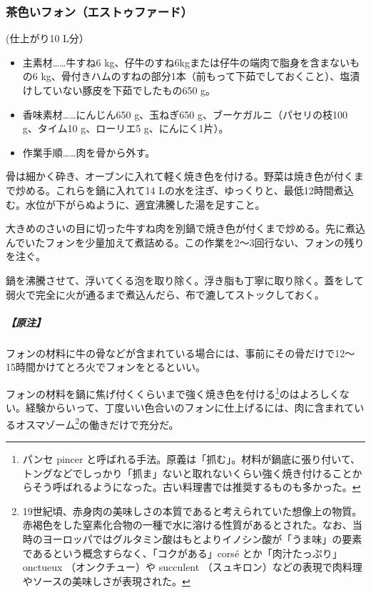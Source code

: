 \begin{recette}

\hypertarget{fonds-brun}{%
\subsubsection{茶色いフォン（エストゥファード）}\label{fonds-brun}}


 

(仕上がり10 L分）

\begin{itemize}
\item
  主素材\ldots{}\ldots{}牛すね6
  kg、仔牛のすね6kgまたは仔牛の端肉で脂身を含まないもの6
  kg、骨付きハムのすねの部分1本（前もって下茹でしておくこと）、塩漬けしていない豚皮を下茹でしたもの650
  g。
\item
  香味素材\ldots{}\ldots{}にんじん650 g、玉ねぎ650
  g、ブーケガルニ（パセリの枝100 g、タイム10 g、ローリエ5
  g、にんにく1片）。
\item
  作業手順\ldots{}\ldots{}肉を骨から外す。
\end{itemize}

骨は細かく砕き、オーブンに入れて軽く焼き色を付ける。野菜は焼き色が付くまで炒める。これらを鍋に入れて14
Lの水を注ぎ、ゆっくりと、最低12時間煮込む。水位が下がらぬように、適宜沸騰した湯を足すこと。

大きめのさいの目に切った牛すね肉を別鍋で焼き色が付くまで炒める。先に煮込んでいたフォンを少量加えて煮詰める。この作業を2〜3回行ない、フォンの残りを注ぐ。

鍋を沸騰させて、浮いてくる泡を取り除く。浮き脂も丁寧に取り除く。蓋をして弱火で完全に火が通るまで煮込んだら、布で漉してストックしておく。

\hypertarget{nota-fonds-brun}{%
\subparagraph{【原注】}\label{nota-fonds-brun}}

フォンの材料に牛の骨などが含まれている場合には、事前にその骨だけで12〜
15時間かけてとろ火でフォンをとるといい。

フォンの材料を鍋に焦げ付くくらいまで強く焼き色を付ける\footnote{パンセ
  pincer
  と呼ばれる手法。原義は「抓む」。材料が鍋底に張り付いて、トングなどでしっかり「抓ま」ないと取れないくらい強く焼き付けることからそう呼ばれるようになった。古い料理書では推奨するものも多かった。}のはよろしくない。経験からいって、丁度いい色合いのフォンに仕上げるには、肉に含まれているオスマゾーム\footnote{19世紀頃、赤身肉の美味しさの本質であると考えられていた想像上の物質。赤褐色をした窒素化合物の一種で水に溶ける性質があるとされた。なお、当時のヨーロッパではグルタミン酸はもとよりイノシン酸が「うま味」の要素であるという概念すらなく、「コクがある」corsé
  とか「肉汁たっぷり」onctueux （オンクチュー）や succulent
  （スュキロン）などの表現で肉料理やソースの美味しさが表現された。}の働きだけで充分だ。


\end{recette}
